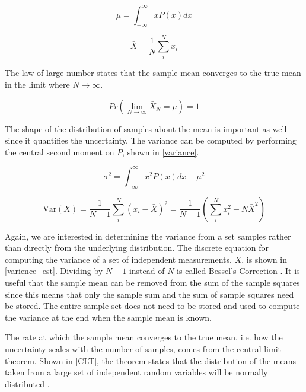 \begin{equation}
\label{int_mean}
\mu = \int_{-\infty}^{\infty} x P(x) dx
\end{equation}

\begin{equation}
\label{arith_mean}
\bar{X} = \frac{1}{N} \sum_i^N x_i
\end{equation}

The law of large number states that the sample mean converges to the true mean in the limit where $N\rightarrow\infty$.  

\begin{equation}
\label{LLN}
Pr\left(\lim_{N\rightarrow\infty} \bar{X}_N = \mu \right) = 1
\end{equation}

The shape of the distribution of samples about the mean is important as well since it quantifies the uncertainty.  The variance can be computed by performing the central second moment on $P$, shown in \eqref{variance}. 

\begin{equation}
\label{variance}
\sigma^2 = \int_{-\infty}^{\infty} x^2 P(x) dx- \mu^2 
\end{equation}

\begin{equation}
\label{varience_est}
\mathrm{Var}(X)  =  \frac{1}{N-1} \sum_i^N (x_i-\bar{X})^2 =  \frac{1}{N-1} \left( \sum_i^N x_i^2-N\bar{X}^2 \right)
\end{equation}

Again, we are interested in determining the variance from a set samples rather than directly from the underlying distribution.  The discrete equation for computing the variance of a set of independent measurements, $X$, is shown in \eqref{varience_est}.  Dividing by $N-1$ instead of $N$ is called Bessel's Correction \cite{openmc}.  It is useful that the sample mean can be removed from the sum of the sample squares since this means that only the sample sum and the sum of sample squares need be stored.  The entire sample set does not need to be stored and used to compute the variance at the end when the sample mean is known.

The rate at which the sample mean converges to the true mean, i.e. how the uncertainty scales with the number of samples, comes from the central limit theorem.  Shown in \eqref{CLT}, the theorem states that the distribution of the means taken from a large set of independent random variables will be normally distributed \cite{openmc}.  

